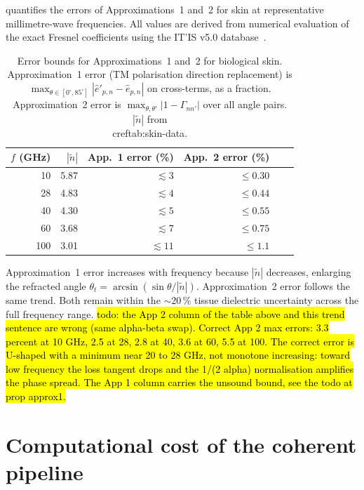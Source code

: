 \documentclass[11pt,a4paper]{article}
\theoremstyle{definition}      %
\begin{document}
 quantifies the errors of
Approximations~1 and~2 for skin at representative millimetre-wave
frequencies.  All values are derived from numerical evaluation of
the exact Fresnel coefficients using the IT'IS v5.0
database~\cite{ITISv5}.

\begin{table}[!htbp]
\centering
\caption{Error bounds for Approximations~1 and~2 for biological
  skin.  Approximation~1 error (TM polarisation direction
  replacement) is $\max_{\theta\in[0^\circ,85^\circ]}
  |\hat{e}'_{p,n} - \hat{e}_{p,n}|$ on cross-terms, as a fraction.
  Approximation~2 error is $\max_{\theta,\theta'}
  |1 - \Gamma_{nn'}|$ over all angle pairs.
  $|\tilde{n}|$ from \\cref{tab:skin-data}.}%
\label{tab:approx-accuracy}
\begin{tabular}{rrrrrr}
\toprule
$f$ (GHz) & $|\tilde{n}|$ &
  App.~1 error (\%) & App.~2 error (\%) \\
\midrule
10  & 5.87 & $\lesssim 3$   & $\leq 0.30$ \\
28  & 4.83 & $\lesssim 4$   & $\leq 0.44$ \\
40  & 4.30 & $\lesssim 5$   & $\leq 0.55$ \\
60  & 3.68 & $\lesssim 7$   & $\leq 0.75$ \\
100 & 3.01 & $\lesssim 11$  & $\leq 1.1$  \\
\bottomrule
\end{tabular}
\end{table}

Approximation~1 error increases with frequency because $|\tilde{n}|$
decreases, enlarging the refracted angle $\theta_t = \arcsin(\sin\theta/|\tilde{n}|)$.
Approximation~2 error follows the same trend.  Both remain within
the $\sim\!20\,\%$ tissue dielectric uncertainty across the full
frequency range.
\hl{todo: the App 2 column of the table above and this trend sentence
are wrong (same alpha-beta swap). Correct App 2 max errors: 3.3
percent at 10 GHz, 2.5 at 28, 2.8 at 40, 3.6 at 60, 5.5 at 100. The
correct error is U-shaped with a minimum near 20 to 28 GHz, not
monotone increasing: toward low frequency the loss tangent drops and
the 1/(2 alpha) normalisation amplifies the phase spread. The App 1
column carries the unsound bound, see the todo at prop approx1.}

\section{Computational cost of the coherent pipeline}\label{app:coherent-cost}
\end{document}
